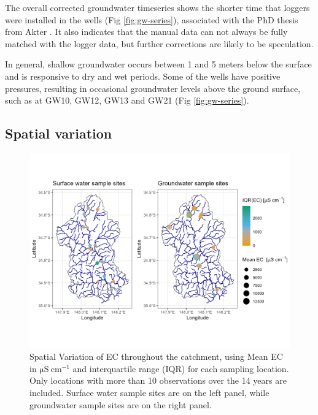 \documentclass[, manuscript]{copernicus}
\begin{document}
The overall corrected groundwater timeseries shows the shorter time that
loggers were installed in the wells (Fig \ref{fig:gw-series}),
associated with the PhD thesis from Akter \citeyearpar{Akter2018}. It
also indicates that the manual data can not always be fully matched with
the logger data, but further corrections are likely to be speculation.

In general, shallow groundwater occurs between 1 and 5 meters below the
surface and is responsive to dry and wet periods. Some of the wells have
positive pressures, resulting in occasional groundwater levels above the
ground surface, such as at GW10, GW12, GW13 and GW21 (Fig
\ref{fig:gw-series}).

\subsection{Spatial variation}

\begin{figure}
\includegraphics[width=1\linewidth]{Figures/ec_map} \caption{Spatial Variation of EC throughout the catchment, using Mean EC in $\mathrm{\mu S~cm^{-1}}$ and interquartile range (IQR) for each sampling location. Only locations with more than 10 observations over the 14 years are included. Surface water sample sites are on the left panel, while groundwater sample sites are on the right panel. }\label{fig:ECmap}
\end{figure}

\clearpage
\end{document}
